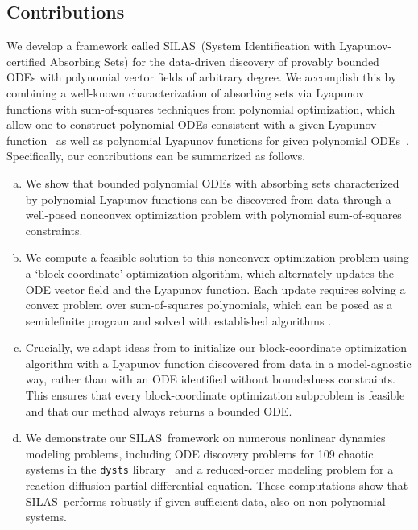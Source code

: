 \documentclass[11pt]{amsart}
\numberwithin{equation}{section}
\theoremstyle{plain}
\theoremstyle{definition}
\theoremstyle{remark}
\newcommand{\methodname}{{SILAS}}
\begin{document}
\subsection{Contributions}
We develop a framework called \methodname\ (System Identification with Lyapunov-certified Absorbing Sets) for the data-driven discovery of provably bounded ODEs with polynomial vector fields of arbitrary degree. We accomplish this by combining a well-known characterization of absorbing sets via Lyapunov functions with sum-of-squares techniques from polynomial optimization, which allow one to construct polynomial ODEs consistent with a given Lyapunov function~\cite{ahmadi2023side} as well as polynomial Lyapunov functions for given polynomial ODEs~\cite{Goluskin2020}. Specifically, our contributions can be summarized as follows.
\begin{enumerate}[a), itemsep=0.15ex,
            leftmargin = \parindent, %
            labelsep = *, %
            widest = 9,
            ]
    \item We show that bounded polynomial ODEs with absorbing sets characterized by polynomial Lyapunov functions can be discovered from data through a well-posed nonconvex optimization problem with polynomial sum-of-squares constraints.
    
    \item We compute a feasible solution to this nonconvex optimization problem using a `block-coordinate' optimization algorithm, which alternately updates the ODE vector field and the Lyapunov function.
    Each update requires solving a convex problem over sum-of-squares polynomials, which can be posed as a semidefinite program and solved with established algorithms \cite{Lasserre2001,Parrilo2003,Nesterov2000,Laurent2009,Lasserre2010,Parrilo2013}.
    
    \item Crucially, we adapt ideas from \cite{Bramburger2024} to initialize our block-coordinate optimization algorithm with a Lyapunov function discovered from data in a model-agnostic way, rather than with an ODE identified without boundedness constraints. This ensures that every block-coordinate optimization subproblem is feasible and that our method always returns a bounded ODE.
    
    \item We demonstrate our \methodname\ framework on numerous nonlinear dynamics modeling problems, including ODE discovery problems for 109 chaotic systems in the \texttt{dysts} library~\cite{gilpin2021chaos} and a reduced-order modeling problem for a reaction-diffusion partial differential equation. These computations show that \methodname\ performs robustly if given sufficient data, also on non-polynomial systems.
\end{enumerate}
\end{document}
